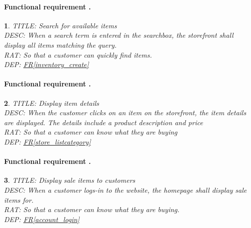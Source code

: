 \documentclass{scrreprt}
\theoremstyle{funreq}
\newtheorem{funreq}{}
\newcommand*{\reqref}[1]{\hyperref[#1]{FR\ref*{#1}}}
\begin{document}
\paragraph[]{Functional requirement .}
\begin{funreq}
	\label{store_search}
	TITLE: Search for available items\\
	DESC: When a search term is entered in the searchbox, the storefront shall display all items matching the query.\\
	RAT: So that a customer can quickly find items.\\
	DEP: \reqref{inventory_create}\\
\end{funreq}

\paragraph[]{Functional requirement .}
\begin{funreq}
	\label{store_details}
	TITLE: Display item details\\
	DESC: When the customer clicks on an item on the storefront, the item details are displayed.  The details include a product description and price\\
	RAT: So that a customer can know what they are buying\\
	DEP: \reqref{store_listcategory}\\
\end{funreq}

\paragraph[]{Functional requirement .}
\begin{funreq}
	\label{store_displaysales}
	TITLE: Display sale items to customers\\
	DESC: When a customer logs-in to the website, the homepage shall display sale items for.\\
	RAT: So that a customer can know what they are buying.\\
	DEP: \reqref{account_login}\\
\end{funreq}
\end{document}
